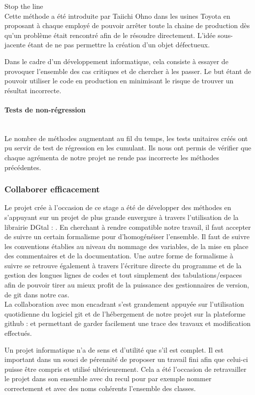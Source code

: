 \begin{Definition}{Stop the line}\\
\label{def:stopthline}
   Cette méthode a été introduite par Taiichi Ohno dans les usines Toyota en proposant à chaque employé de pouvoir arrêter toute la chaine de production dès qu'un problème était rencontré afin de le résoudre directement. L'idée sous-jacente étant de ne pas permettre la création d'un objet défectueux.
\end{Definition}

Dans le cadre d'un développement informatique, cela consiste à essayer de provoquer l'ensemble des cas critiques et de chercher à les passer. Le but étant de pouvoir utiliser le code en production en minimisant le risque de trouver un résultat incorrecte.

\paragraph{Tests de non-régression}\\

Le nombre de méthodes augmentant au fil du temps, les tests unitaires créés ont pu servir de test de régression en les cumulant. Ils nous ont permis de vérifier que chaque agrémenta de notre projet ne rende pas incorrecte les méthodes précédentes.\\


\subsubsection{Collaborer efficacement}

Le projet crée à l'occasion de ce stage a été de développer des méthodes en s'appuyant sur un projet de plus grande envergure à travers l'utilisation de la librairie DGtal : \cite{DGtal}. En cherchant à rendre compatible notre travail, il faut accepter de suivre un certain formalisme pour d'homogénéiser l'ensemble. Il faut de suivre les conventions établies au niveau du nommage des variables, de la mise en place des commentaires et de la documentation. Une autre forme de formalisme à suivre se retrouve également à travers l'écriture directe du programme et de la gestion des longues lignes de codes et tout simplement des tabulations/espaces afin de pouvoir tirer au mieux profit de la puissance des gestionnaires de version, de git dans notre cas.\\

La collaboration avec mon encadrant s'est grandement appuyée sur l'utilisation quotidienne du logiciel git et de l’hébergement de notre projet sur la plateforme github : \cite{github-tristan} et \cite{github-thomas} permettant de garder facilement une trace des travaux et modification effectués.

Un projet informatique n'a de sens et d'utilité que s'il est complet. Il est important dans un souci de pérennité de proposer un travail fini afin que celui-ci puisse être compris et utilisé ultérieurement. Cela a été l’occasion de retravailler le projet dans son ensemble avec du recul pour par exemple nommer correctement et avec des noms cohérents l'ensemble des classes.


